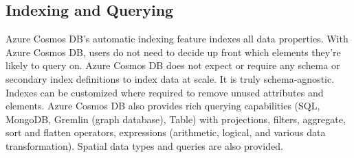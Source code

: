 \subsection{Indexing and Querying}
Azure Cosmos DB’s automatic indexing feature indexes all data properties. With Azure Cosmos DB, users do not need to decide up front which elements they're likely to query on. Azure Cosmos DB does not expect or require any schema or secondary index definitions to index data at scale. It is truly schema-agnostic. Indexes can be customized where required to remove unused attributes and elements.
Azure Cosmos DB also provides rich querying capabilities (SQL, MongoDB, Gremlin (graph database), Table) with projections, filters, aggregate, sort and flatten operators, expressions (arithmetic, logical, and various data transformation). Spatial data types and queries are also provided. 

